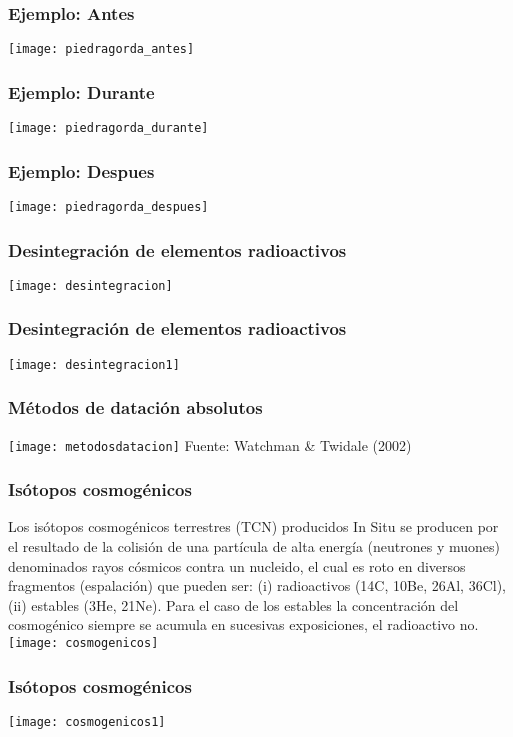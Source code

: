 \documentclass{beamer}
\begin{document}
\begin{frame}
\frametitle{Ejemplo: Antes}
\centering
\texttt{[image: piedragorda\_antes]}
\end{frame}
\begin{frame}
\frametitle{Ejemplo: Durante}
\centering
\texttt{[image: piedragorda\_durante]}
\end{frame}
\begin{frame}
\frametitle{Ejemplo: Despues}
\centering
\texttt{[image: piedragorda\_despues]}
\end{frame}
\begin{frame}
\frametitle{Desintegración de elementos radioactivos}
\centering
\texttt{[image: desintegracion]}
\end{frame}
\begin{frame}
\frametitle{Desintegración de elementos radioactivos}
\centering
\texttt{[image: desintegracion1]}
\end{frame}
\begin{frame}
\frametitle{Métodos de datación absolutos}
\centering
\texttt{[image: metodosdatacion]}
\tiny{Fuente: Watchman \& Twidale (2002)}
\end{frame}
\begin{frame}
\frametitle{Isótopos cosmogénicos}
\small{Los isótopos cosmogénicos terrestres (TCN) producidos In Situ se producen por el resultado de la colisión de una partícula de alta energía (neutrones y muones) denominados rayos cósmicos contra un nucleido, el cual es roto en diversos fragmentos (espalación) que pueden ser: (i) radioactivos (14C, 10Be, 26Al, 36Cl), (ii) estables (3He, 21Ne). Para el caso de los estables la concentración del cosmogénico siempre se acumula en sucesivas exposiciones, el radioactivo no.}
\centering
\texttt{[image: cosmogenicos]}
\end{frame}
\begin{frame}
\frametitle{Isótopos cosmogénicos}
\centering
\texttt{[image: cosmogenicos1]}
\end{frame}
\end{document}
